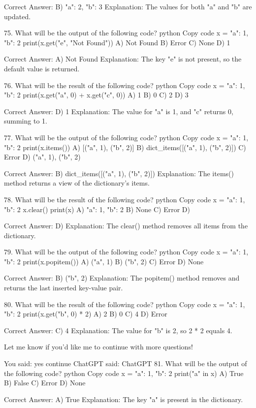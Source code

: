 Correct Answer: B) {"a": 2, "b": 3}
Explanation: The values for both "a" and "b" are updated.

75. What will be the output of the following code?
python
Copy code
x = {"a": 1, "b": 2}
print(x.get("e", "Not Found"))
A) Not Found
B) Error
C) None
D) 1

Correct Answer: A) Not Found
Explanation: The key "e" is not present, so the default value is returned.

76. What will be the result of the following code?
python
Copy code
x = {"a": 1, "b": 2}
print(x.get("a", 0) + x.get("c", 0))
A) 1
B) 0
C) 2
D) 3

Correct Answer: D) 1
Explanation: The value for "a" is 1, and "c" returns 0, summing to 1.

77. What will be the output of the following code?
python
Copy code
x = {"a": 1, "b": 2}
print(x.items())
A) [("a", 1), ("b", 2)]
B) dict_items([("a", 1), ("b", 2)])
C) Error
D) {("a", 1), ("b", 2)}

Correct Answer: B) dict_items([("a", 1), ("b", 2)])
Explanation: The items() method returns a view of the dictionary's items.

78. What will be the result of the following code?
python
Copy code
x = {"a": 1, "b": 2}
x.clear()
print(x)
A) {"a": 1, "b": 2}
B) None
C) Error
D) {}

Correct Answer: D) {}
Explanation: The clear() method removes all items from the dictionary.

79. What will be the output of the following code?
python
Copy code
x = {"a": 1, "b": 2}
print(x.popitem())
A) ("a", 1)
B) ("b", 2)
C) Error
D) None

Correct Answer: B) ("b", 2)
Explanation: The popitem() method removes and returns the last inserted key-value pair.

80. What will be the result of the following code?
python
Copy code
x = {"a": 1, "b": 2}
print(x.get("b", 0) * 2)
A) 2
B) 0
C) 4
D) Error

Correct Answer: C) 4
Explanation: The value for "b" is 2, so 2 * 2 equals 4.

Let me know if you'd like me to continue with more questions!






You said:
yes continue
ChatGPT said:
ChatGPT
81. What will be the output of the following code?
python
Copy code
x = {"a": 1, "b": 2}
print("a" in x)
A) True
B) False
C) Error
D) None

Correct Answer: A) True
Explanation: The key "a" is present in the dictionary.

